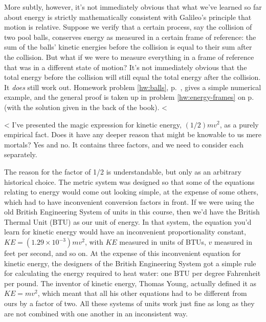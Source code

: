More subtly, however, it's not immediately obvious that what
we've learned so far about energy is strictly mathematically
consistent with Galileo's principle that motion is relative.
Suppose we verify that a certain process, say the collision
of two pool balls, conserves energy as measured in a certain
frame of reference: the sum of the balls' kinetic energies
before the collision is equal to their sum after the
collision. But what if we were to
measure everything in a frame of reference that was in a
different state of motion? It's not immediately obvious that the
total energy before the collision will still equal the total
energy after the collision. 
It \emph{does} still work out. Homework problem \ref{hw:balls}, p.~\pageref{hw:balls},
gives a simple numerical example, and the general
proof is taken up in problem \ref{hw:energy-frames} on p.~\pageref{hw:energy-frames} (with the solution
given in the back of the book).
<%

<%
I've presented the magic expression for kinetic energy, $(1/2)mv^2$, as a purely empirical fact.
Does it have any deeper reason that might be knowable to us mere mortals? Yes and no. It contains
three factors, and we need to consider each separately.

The reason for the factor of 1/2 is understandable, but only as an arbitrary historical choice.
The metric system was designed so that some of the equations relating
to energy would come out looking simple, at the expense of
some others, which had to have inconvenient conversion
factors in front. If we were using the old British
Engineering System of units in this course, then we'd have
the British Thermal Unit (BTU) as our unit of energy. In
that system, the equation you'd learn for kinetic energy
would have an inconvenient proportionality constant,
$KE=\left(1.29\times10^{-3}\right)mv^2$, with $KE$ measured
in units of BTUs, $v$ measured in feet per second, and so on.
At the expense of this inconvenient equation for kinetic
energy, the designers of the British Engineering System got
a simple rule for calculating the energy required to heat
water: one BTU per degree Fahrenheit per pound. The
inventor of kinetic energy, Thomas Young, actually defined
it as $KE=mv^2$, which meant that all his other
equations had to be different from ours by a factor of two.
All these systems of units work just fine as long as they
are not combined with one another in an inconsistent way.


